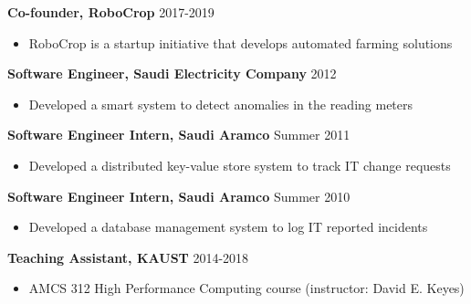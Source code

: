 \documentclass[9pt,a4paper]{extarticle}
\begin{document}
{
\textbf{Co-founder, RoboCrop} \hfill 2017-2019
\begin{itemize}
  \item RoboCrop is a startup initiative that develops automated farming solutions\\
\end{itemize}

\textbf{Software Engineer, Saudi Electricity Company} \hfill 2012
\begin{itemize}
  \item Developed a smart system to detect anomalies in the reading meters\\
\end{itemize}

\textbf{Software Engineer Intern, Saudi Aramco} \hfill Summer 2011
\begin{itemize}
  \item Developed a distributed key-value store system to track IT change requests\\
\end{itemize}

\textbf{Software Engineer Intern, Saudi Aramco} \hfill Summer 2010
\begin{itemize}
  \item Developed a database management system to log IT reported incidents
\end{itemize}
}
\bigskip
\bigskip

{
\textbf{Teaching Assistant, KAUST} \hfill 2014-2018
\begin{itemize}
  \item AMCS 312 High Performance Computing course (instructor: David E. Keyes)
\end{itemize}
}
\bigskip
\bigskip
\end{document}
